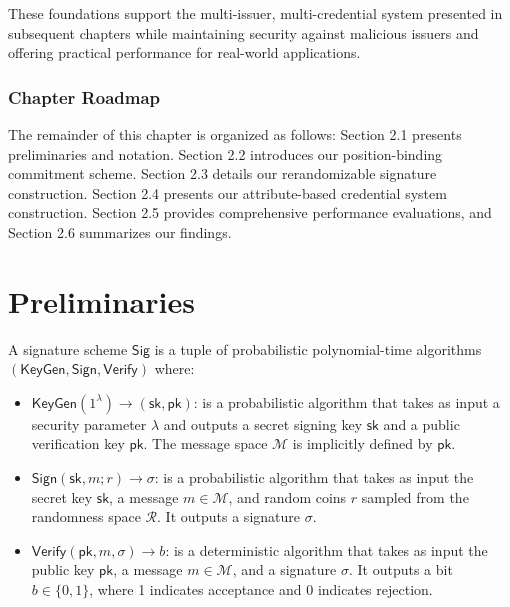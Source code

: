 These foundations support the multi-issuer, multi-credential system presented in subsequent chapters while maintaining security against malicious issuers and offering practical performance for real-world applications.


\subsubsection*{Chapter Roadmap}
The remainder of this chapter is organized as follows: Section 2.1 presents preliminaries and notation. Section 2.2 introduces our position-binding commitment scheme. Section 2.3 details our rerandomizable signature construction. Section 2.4 presents our attribute-based credential system construction. Section 2.5 provides comprehensive performance evaluations, and Section 2.6 summarizes our findings.


















\newpage
\section{Preliminaries}

\begin{definition}
A signature scheme $\mathsf{Sig}$ is a tuple of probabilistic polynomial-time algorithms $(\mathsf{KeyGen}, \mathsf{Sign}, \mathsf{Verify})$ where:

\begin{itemize}
    \item $\mathsf{KeyGen}(1^\lambda) \rightarrow (\mathsf{sk}, \mathsf{pk})$: is a probabilistic algorithm that takes as input a security parameter $\lambda$ and outputs a secret signing key $\mathsf{sk}$ and a public verification key $\mathsf{pk}$. The message space $\mathcal{M}$ is implicitly defined by $\mathsf{pk}$.
    
    \item $\mathsf{Sign}(\mathsf{sk}, m; r) \rightarrow \sigma$: is a probabilistic algorithm that takes as input the secret key $\mathsf{sk}$, a message $m \in \mathcal{M}$, and random coins $r$ sampled from the randomness space $\mathcal{R}$. It outputs a signature $\sigma$.
    
    \item $\mathsf{Verify}(\mathsf{pk}, m, \sigma) \rightarrow b$: is a deterministic algorithm that takes as input the public key $\mathsf{pk}$, a message $m \in \mathcal{M}$, and a signature $\sigma$. It outputs a bit $b \in \{0,1\}$, where 1 indicates acceptance and 0 indicates rejection.
\end{itemize}

\end{definition}

